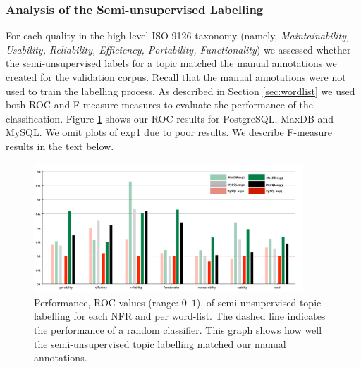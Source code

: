 \documentclass[smallextended]{svjour3}       %
\begin{document}
\subsubsection{Analysis of the Semi-unsupervised Labelling} %
For each quality in the high-level ISO 9126 taxonomy (namely, \emph{Maintainability, Usability, Reliability, Efficiency, Portability, Functionality}) we assessed whether the semi-unsupervised labels for a topic matched the manual annotations we created for the validation corpus. 
Recall that the manual annotations were not used to
train the labelling process.
As described in Section \ref{sec:wordlist} we used both ROC and F-measure measures to evaluate the performance of the classification.
Figure \ref{fig:maxdb-unsup-results} shows our ROC results for
PostgreSQL, MaxDB and MySQL. We omit plots of \textsf{exp1} due to poor results. We describe F-measure results in the text below.





\begin{figure}[t]
  \centering
 \includegraphics[width=0.9\textwidth]{figures/unsupervised-bar}
 \caption{Performance, ROC values (range: $0$--$1$), of semi-unsupervised topic labelling for
   each NFR and per word-list. The dashed line indicates the performance of a random classifier. This graph shows how well the
   semi-unsupervised topic labelling matched our manual annotations.}


  \label{fig:maxdb-unsup-results}
\end{figure}
\end{document}

